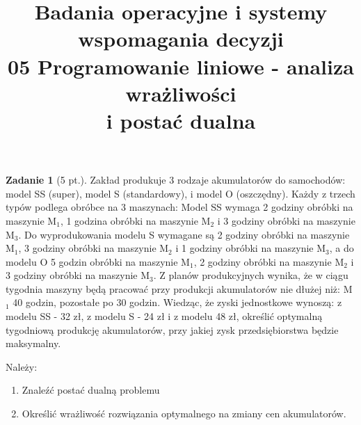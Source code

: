 \documentclass{article}[]
\theoremstyle{definition}
\newtheorem{zad}{Zadanie}
\begin{document}
\title{Badania operacyjne i systemy wspomagania decyzji
\\ \Large 05 Programowanie liniowe - analiza wrażliwości\\ i postać dualna}
\date{}

\maketitle

\begin{zad}[5 pt.]
Zakład produkuje 3 rodzaje akumulatorów do samochodów: model SS (super), model S (standardowy), i model O (oszczędny). Każdy z trzech typów podlega obróbce na 3 maszynach: Model SS wymaga 2 godziny obróbki  na maszynie M$_1$, 1 godzina obróbki na maszynie M$_2$ i 3 godziny obróbki na maszynie M$_3$.  Do wyprodukowania modelu S wymagane są 2 godziny obróbki  na maszynie M$_1$, 3 godziny obróbki na maszynie M$_2$ i 1 godziny obróbki na maszynie M$_3$, a do modelu O 5 godzin obróbki  na maszynie M$_1$, 2 godziny obróbki na maszynie M$_2$ i 3 godziny obróbki na maszynie M$_3$. Z planów produkcyjnych wynika, że w ciągu tygodnia maszyny będą pracować przy produkcji akumulatorów nie dłużej niż: M$_1$ 40 godzin, pozostałe po 30 godzin. Wiedząc, że zyski jednostkowe wynoszą: z modelu SS - 32 zł, z modelu S - 24 zł i z modelu 48 zł, określić optymalną tygodniową produkcję akumulatorów, przy jakiej zysk przedsiębiorstwa będzie maksymalny. 

Należy:

\begin{enumerate}
\item Znaleźć postać dualną problemu
\item Określić wrażliwość rozwiązania optymalnego na zmiany cen akumulatorów.
\end{enumerate}
\end{zad}
\end{document}
